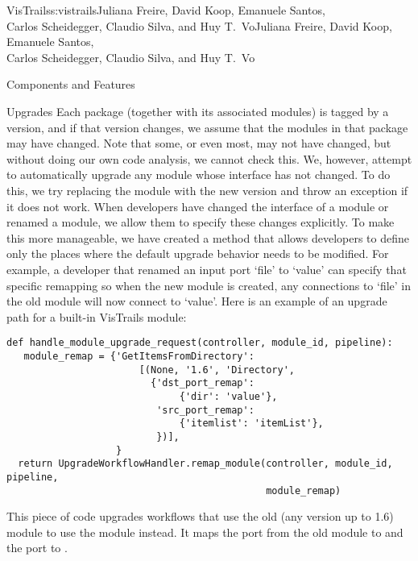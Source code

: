 \begin{aosachaptertoc}{VisTrails}{s:vistrails}{Juliana Freire, David Koop, Emanuele Santos, \\ Carlos Scheidegger, Claudio Silva, and Huy T.\ Vo}{Juliana Freire, David Koop, Emanuele Santos, \\ \hspace*{0.9cm} Carlos Scheidegger, Claudio Silva, and Huy T.\ Vo}
\begin{aosasect1}{Components and Features}
\begin{aosasect2}{Upgrades}
Each package (together with its associated modules) is tagged by a
version, and if that version changes, we assume that the modules in
that package may have changed.  Note that some, or even most, may not
have changed, but without doing our own code analysis, we cannot check
this.  We, however, attempt to automatically upgrade any module
whose interface has not changed.  To do this, we try replacing the
module with the new version and throw an exception if it does not
work.  When developers have changed the interface of a module or
renamed a module, we allow them to specify these changes explicitly.
To make this more manageable, we have created a 
method that allows developers to define only the places where the
default upgrade behavior needs to be modified.  For example, a
developer that renamed an input port `file' to `value' can specify
that specific remapping so when the new module is created, any
connections to `file' in the old module will now connect to
`value'. Here is an example of an upgrade path for a built-in
VisTrails module:

\begin{verbatim}
def handle_module_upgrade_request(controller, module_id, pipeline):
   module_remap = {'GetItemsFromDirectory':
                       [(None, '1.6', 'Directory',
                         {'dst_port_remap':
                              {'dir': 'value'},
                          'src_port_remap':
                              {'itemlist': 'itemList'},
                          })],
                   }
  return UpgradeWorkflowHandler.remap_module(controller, module_id, pipeline,
                                             module_remap)
\end{verbatim}

This piece of code upgrades workflows that use the old
 (any version up to 1.6) module to use the
 module instead.  It maps the  port from the
old module to  and the  port to
.


\end{aosasect2}
\end{aosasect1}
\end{aosachaptertoc}
